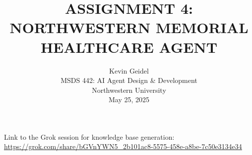 \documentclass[11pt,letterpaper]{article}
\begin{document}
\selectfont
{}
\doublespacing
\setlength{\droptitle}{1in} 

\title{\large{ASSIGNMENT 4: \\ NORTHWESTERN MEMORIAL HEALTHCARE AGENT \\\vspace{1.2in}}}

\author{
Kevin Geidel \\
MSDS 442: AI Agent Design \& Development \\
Northwestern University \\
May 25, 2025 \\
}

\date{}
\maketitle
\thispagestyle{empty}	
\clearpage
\setcounter{page}{1}





Link to the Grok session for knowledge base generation: \url{https://grok.com/share/bGVnYWN5_2b101ac8-5575-458e-a8be-7c50e3134e34}
\end{document}
